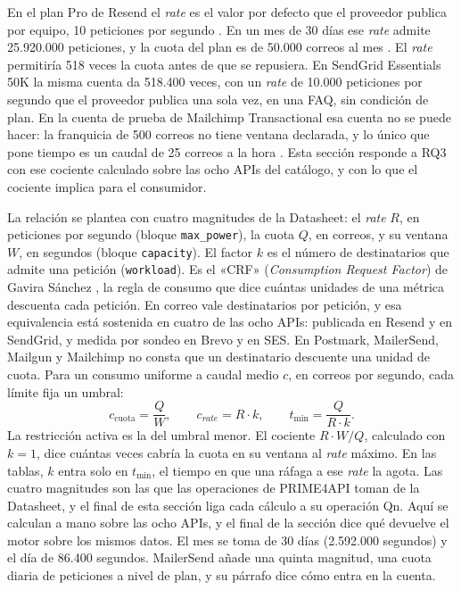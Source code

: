 En el plan Pro de Resend el \textit{rate} es el valor por defecto que el proveedor publica por equipo, 10 peticiones por segundo \citep{resenddocs}.
En un mes de 30 días ese \textit{rate} admite 25.920.000 peticiones, y la cuota del plan es de 50.000 correos al mes \citep{resendpricing}.
El \textit{rate} permitiría 518 veces la cuota antes de que se repusiera.
En SendGrid Essentials 50K \citep{sendgridpricing} la misma cuenta da 518.400 veces, con un \textit{rate} de 10.000 peticiones por segundo que el proveedor publica una sola vez, en una FAQ, sin condición de plan.
En la cuenta de prueba de Mailchimp Transactional esa cuenta no se puede hacer: la franquicia de 500 correos no tiene ventana declarada, y lo único que pone tiempo es un caudal de 25 correos a la hora \citep{mailchimpdocs}.
Esta sección responde a RQ3 con ese cociente calculado sobre las ocho APIs del catálogo, y con lo que el cociente implica para el consumidor.

La relación se plantea con cuatro magnitudes de la Datasheet: el \textit{rate} $R$, en peticiones por segundo (bloque \texttt{max\_power}), la cuota $Q$, en correos, y su ventana $W$, en segundos (bloque \texttt{capacity}).
El factor $k$ es el número de destinatarios que admite una petición (\texttt{workload}).
Es el «CRF» (\textit{Consumption Request Factor}) de Gavira Sánchez \citep{gavira2026tfm}, la regla de consumo que dice cuántas unidades de una métrica descuenta cada petición.
En correo vale destinatarios por petición, y esa equivalencia está sostenida en cuatro de las ocho APIs: publicada en Resend y en SendGrid, y medida por sondeo en Brevo y en SES.
En Postmark, MailerSend, Mailgun y Mailchimp no consta que un destinatario descuente una unidad de cuota.
Para un consumo uniforme a caudal medio $c$, en correos por segundo, cada límite fija un umbral:
\begin{equation}
c_{\mathrm{cuota}} = \frac{Q}{W}, \qquad c_{\mathit{rate}} = R \cdot k, \qquad t_{\min} = \frac{Q}{R \cdot k}.
\label{eq:limites-rates}
\end{equation}
La restricción activa es la del umbral menor.
El cociente $R \cdot W / Q$, calculado con $k = 1$, dice cuántas veces cabría la cuota en su ventana al \textit{rate} máximo.
En las tablas, $k$ entra solo en $t_{\min}$, el tiempo en que una ráfaga a ese \textit{rate} la agota.
Las cuatro magnitudes son las que las operaciones de PRIME4API \citep{gavira2026tfm} toman de la Datasheet, y el final de esta sección liga cada cálculo a su operación Qn.
Aquí se calculan a mano sobre las ocho APIs, y el final de la sección dice qué devuelve el motor sobre los mismos datos.
El mes se toma de 30 días (2.592.000 segundos) y el día de 86.400 segundos.
MailerSend añade una quinta magnitud, una cuota diaria de peticiones a nivel de plan, y su párrafo dice cómo entra en la cuenta.

